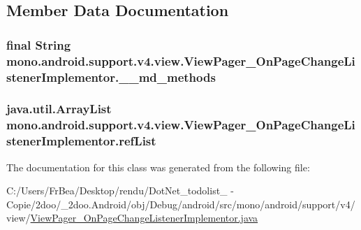 \subsection{Member Data Documentation}
\hypertarget{classmono_1_1android_1_1support_1_1v4_1_1view_1_1_view_pager___on_page_change_listener_implementor_5133c757511dd09339d00fbc794ef33a}{
\subsubsection[{\_\-\_\-md\_\-methods}]{\setlength{\rightskip}{0pt plus 5cm}final String {\bf mono.android.support.v4.view.ViewPager\_\-OnPageChangeListenerImplementor.\_\-\_\-md\_\-methods}}}
\label{classmono_1_1android_1_1support_1_1v4_1_1view_1_1_view_pager___on_page_change_listener_implementor_5133c757511dd09339d00fbc794ef33a}


\hypertarget{classmono_1_1android_1_1support_1_1v4_1_1view_1_1_view_pager___on_page_change_listener_implementor_decda4faad50e9549be7c7b10a5e4e55}{
\subsubsection[{refList}]{\setlength{\rightskip}{0pt plus 5cm}java.util.ArrayList {\bf mono.android.support.v4.view.ViewPager\_\-OnPageChangeListenerImplementor.refList}}}
\label{classmono_1_1android_1_1support_1_1v4_1_1view_1_1_view_pager___on_page_change_listener_implementor_decda4faad50e9549be7c7b10a5e4e55}




The documentation for this class was generated from the following file:\begin{CompactItemize}
\item 
C:/Users/FrBea/Desktop/rendu/DotNet\_\-todolist\_ - Copie/2doo/\_\-2doo.Android/obj/Debug/android/src/mono/android/support/v4/view/\hyperlink{_view_pager___on_page_change_listener_implementor_8java}{ViewPager\_\-OnPageChangeListenerImplementor.java}\end{CompactItemize}
